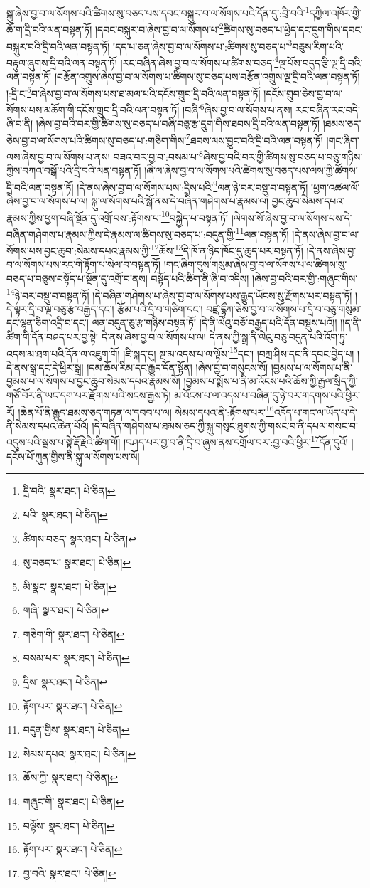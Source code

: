 སྐུ་ཞེས་བྱ་བ་ལ་སོགས་པའི་ཚིགས་སུ་བཅད་པས་དབང་བསྐུར་བ་ལ་སོགས་པའི་དོན་དུ་:བྲི་བའི་\footnote{དྲི་བའི་  སྣར་ཐང་།  པེ་ཅིན། }དཀྱིལ་འཁོར་གྱི་ཆོ་ག་དྲི་བའི་ལན་བསྟན་ཏོ། །དབང་བསྐུར་བ་ཞེས་བྱ་བ་ལ་སོགས་པ་\footnote{པའི་  སྣར་ཐང་།  པེ་ཅིན། }ཚིགས་སུ་བཅད་པ་ཕྱེད་དང་དྲུག་གིས་དབང་བསྐུར་བའི་དྲི་བའི་ལན་བསྟན་ཏོ། །དད་པ་ཅན་ཞེས་བྱ་བ་ལ་སོགས་པ་:ཚིགས་སུ་བཅད་པ་\footnote{ཚིགས་བཅད་  སྣར་ཐང་།  པེ་ཅིན། }བཅུས་རིག་པའི་བརྟུལ་ཞུགས་དྲི་བའི་ལན་བསྟན་ཏོ། །རང་བཞིན་ཞེས་བྱ་བ་ལ་སོགས་པ་ཚིགས་བཅད་\footnote{སུ་བཅད་པ་  སྣར་ཐང་།  པེ་ཅིན། }ལྔ་པོས་བདུད་རྩི་ལྔ་དྲི་བའི་ལན་བསྟན་ཏོ། །བརྩོན་འགྲུས་ཞེས་བྱ་བ་ལ་སོགས་པ་ཚིགས་སུ་བཅད་པས་བརྩོན་འགྲུས་ལྔ་དྲི་བའི་ལན་བསྟན་ཏོ། །:དྲི་ང་\footnote{མི་སྣང་  སྣར་ཐང་།  པེ་ཅིན། }བ་ཞེས་བྱ་བ་ལ་སོགས་པས་ཐ་མལ་པའི་དངོས་གྲུབ་དྲི་བའི་ལན་བསྟན་ཏོ། །དངོས་གྲུབ་ཅེས་བྱ་བ་ལ་སོགས་པས་མཆོག་གི་དངོས་གྲུབ་དྲི་བའི་ལན་བསྟན་ཏོ། །བཞི་\footnote{གཞི་  སྣར་ཐང་།  པེ་ཅིན། }ཞེས་བྱ་བ་ལ་སོགས་པ་ནས། རང་བཞིན་རང་བདེ་ཞི་བ་ནི། །ཞེས་བྱ་བའི་བར་གྱི་ཚིགས་སུ་བཅད་པ་བཞི་བཅུ་རྩ་དྲུག་གིས་ཐབས་དྲི་བའི་ལན་བསྟན་ཏོ། །ཐམས་ཅད་ཅེས་བྱ་བ་ལ་སོགས་པའི་ཚིགས་སུ་བཅད་པ་:གཅིག་གིས་\footnote{གཅིག་གི་  སྣར་ཐང་།  པེ་ཅིན། }ཐབས་ལས་བྱུང་བའི་དྲི་བའི་ལན་བསྟན་ཏོ། །གང་ཞིག་ལས་ཞེས་བྱ་བ་ལ་སོགས་པ་ནས། བཟའ་བར་བྱ་བ་:བསམ་པ་\footnote{བསམ་པར་  སྣར་ཐང་།  པེ་ཅིན། }ཞེས་བྱ་བའི་བར་གྱི་ཚིགས་སུ་བཅད་པ་བཅུ་གཉིས་ཀྱིས་བཀའ་བསྒོ་པའི་དྲི་བའི་ལན་བསྟན་ཏོ། །ཞི་ལ་ཞེས་བྱ་བ་ལ་སོགས་པའི་ཚིགས་སུ་བཅད་པས་ལས་ཀྱི་ཚོགས་དྲི་བའི་ལན་བསྟན་ཏོ། །དེ་ནས་ཞེས་བྱ་བ་ལ་སོགས་པས་:དྲིས་པའི་\footnote{དྲིས་  སྣར་ཐང་།  པེ་ཅིན། }ལན་ཉེ་བར་བསྡུ་བ་བསྟན་ཏོ། །ཕྱག་འཚལ་ལོ་ཞེས་བྱ་བ་ལ་སོགས་པ་ལ། སྐུ་ལ་སོགས་པའི་སྒོ་ནས་དེ་བཞིན་གཤེགས་པ་རྣམས་ལ། བྱང་ཆུབ་སེམས་དཔའ་རྣམས་ཀྱིས་ཕྱག་བཞི་སྔོན་དུ་འགྲོ་བས་:རྟོགས་པ་\footnote{རྟོག་པར་  སྣར་ཐང་།  པེ་ཅིན། }བསྐྱེད་པ་བསྟན་ཏོ། །ལེགས་སོ་ཞེས་བྱ་བ་ལ་སོགས་པས་དེ་བཞིན་གཤེགས་པ་རྣམས་ཀྱིས་དེ་རྣམས་ལ་ཚིགས་སུ་བཅད་པ་:བདུན་གྱི་\footnote{བདུན་གྱིས་  སྣར་ཐང་།  པེ་ཅིན། }ལན་བསྟན་ཏོ། །དེ་ནས་ཞེས་བྱ་བ་ལ་སོགས་པས་བྱང་ཆུབ་:སེམས་དཔའ་རྣམས་ཀྱི་\footnote{སེམས་དཔའ་  སྣར་ཐང་།  པེ་ཅིན། }ཆོས་\footnote{ཆོས་ཀྱི་  སྣར་ཐང་།  པེ་ཅིན། }དེ་ཁོ་ན་ཉིད་ཁོང་དུ་ཆུད་པར་བསྟན་ཏོ། །དེ་ནས་ཞེས་བྱ་བ་ལ་སོགས་པས་རང་གི་རྟོག་པ་སེལ་བ་བསྟན་ཏོ། །གང་ཞིག་དུས་གསུམ་ཞེས་བྱ་བ་ལ་སོགས་པ་ལ་ཚིགས་སུ་བཅད་པ་བཅུས་བསྟོད་པ་སྔོན་དུ་འགྲོ་བ་ནས། བསྟོད་པའི་ཚིག་ནི་ཞི་བ་འདིས། །ཞེས་བྱ་བའི་བར་གྱི་:གཞུང་གིས་\footnote{གཞུང་གི་  སྣར་ཐང་།  པེ་ཅིན། }ཉེ་བར་བསྡུ་བ་བསྟན་ཏོ། །དེ་བཞིན་གཤེགས་པ་ཞེས་བྱ་བ་ལ་སོགས་པས་རྒྱུད་ཡོངས་སུ་རྫོགས་པར་བསྟན་ཏོ། །དེ་ལྟར་དྲི་བ་ལྔ་བཅུ་རྩ་བརྒྱད་དང་། རྩོམ་པའི་དྲི་བ་གཅིག་དང་། བཛྲ་དྷྲྀཀ་ཅེས་བྱ་བ་ལ་སོགས་པ་དྲི་བ་བཅུ་གསུམ་དང་ལྷན་ཅིག་འདྲི་བ་དང་། ལན་བདུན་ཅུ་རྩ་གཉིས་བསྟན་ཏོ། །དེ་ནི་ལེའུ་བཅོ་བརྒྱད་པའི་དོན་བསྡུས་པའོ།། །།ད་ནི་ཚིག་གི་དོན་བཤད་པར་བྱ་སྟེ། དེ་ནས་ཞེས་བྱ་བ་ལ་སོགས་པ་ལ། དེ་ནས་ཀྱི་སྒྲ་ནི་ལེའུ་བཅུ་བདུན་པའི་འོག་ཏུ་འདས་མ་ཐག་པའི་དོན་ལ་འཇུག་གོ། །ཇི་སྐད་དུ། སྔ་མ་འདས་པ་ལ་ལྟོས་\footnote{བལྟོས་  སྣར་ཐང་།  པེ་ཅིན། }དང་། །བཀྲ་ཤིས་དང་ནི་དབང་བྱེད་པ། །དེ་ནས་སྒྲ་དང་དེ་ཕྱིར་སྒྲ། །དམ་ཆོས་རིམ་དང་རྒྱུད་དོན་སྟོན། །ཞེས་བྱ་བ་གསུངས་སོ། །བྱམས་པ་ལ་སོགས་པ་ནི་བྱམས་པ་ལ་སོགས་པ་བྱང་ཆུབ་སེམས་དཔའ་རྣམས་སོ། །བྱམས་པ་སྨོས་པ་ནི་མ་འོངས་པའི་ཆོས་ཀྱི་རྒྱལ་སྲིད་ཀྱི་གཙོ་བོར་ནི་ཡང་དག་པར་རྫོགས་པའི་སངས་རྒྱས་ཏེ། མ་འོངས་པ་ལ་འདས་པ་བཞིན་དུ་ཉེ་བར་གདགས་པའི་ཕྱིར་རོ། །ཆེན་པོ་ནི་རྒྱུད་ཐམས་ཅད་གཏན་ལ་དབབ་པ་ལ། སེམས་དཔའ་ནི་:རྟོགས་པར་\footnote{རྟོག་པར་  སྣར་ཐང་།  པེ་ཅིན། }འདོད་པ་གང་ལ་ཡོད་པ་དེ་ནི་སེམས་དཔའ་ཆེན་པོའོ། །དེ་བཞིན་གཤེགས་པ་ཐམས་ཅད་ཀྱི་སྐུ་གསུང་ཐུགས་ཀྱི་གསང་བ་ནི་དཔལ་གསང་བ་འདུས་པའི་སྦས་པ་སྟེ་རྡོ་རྗེའི་ཚིག་གོ། །བཤད་པར་བྱ་བ་ནི་དྲི་བ་ཞུས་ནས་དགྲོལ་བར་:བྱ་བའི་ཕྱིར་\footnote{བྱ་བའི་  སྣར་ཐང་།  པེ་ཅིན། }དོན་དུའོ། །དངོས་པོ་ཀུན་གྱིས་ནི་སྐུ་ལ་སོགས་པས་སོ། 